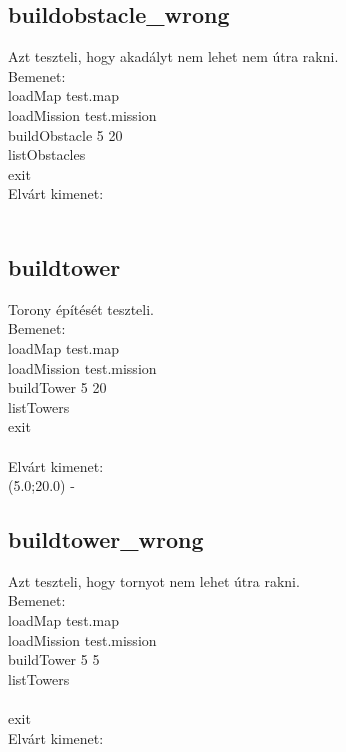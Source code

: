 \subsection{buildobstacle\_wrong}
Azt teszteli, hogy akadályt nem lehet nem útra rakni.\\
Bemenet:\\
loadMap test.map\\
loadMission test.mission\\
buildObstacle 5 20\\
listObstacles\\
exit\\
Elvárt kimenet:\\
\\
\subsection{buildtower}
Torony építését teszteli.\\
Bemenet:\\
loadMap test.map\\
loadMission test.mission\\
buildTower 5 20\\
listTowers\\
exit\\
\\
Elvárt kimenet:\\
(5.0;20.0) -\\
\subsection{buildtower\_wrong}
Azt teszteli, hogy tornyot nem lehet útra rakni.\\
Bemenet:\\
loadMap test.map\\
loadMission test.mission\\
buildTower 5 5\\
listTowers\\
\\
exit\\
Elvárt kimenet:\\
\\
